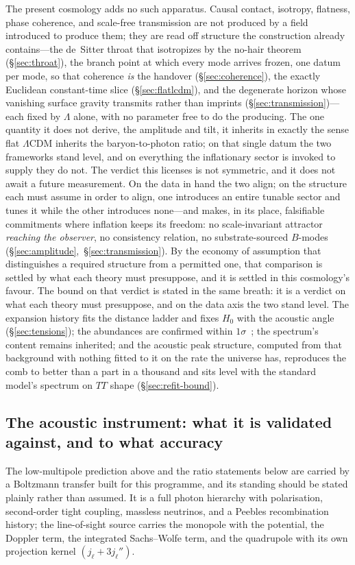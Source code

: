\documentclass[11pt,a4paper]{article}
\theoremstyle{plain}
\theoremstyle{definition}
\theoremstyle{remark}
\begin{document}
The present cosmology adds no such apparatus. Causal contact, isotropy, flatness, phase coherence, and scale-free transmission are not produced by a field introduced to produce them; they are read off structure the construction already contains---the de~Sitter throat that isotropizes by the no-hair theorem (\S\ref{sec:throat}), the branch point at which every mode arrives frozen, one datum per mode, so that coherence \emph{is} the handover (\S\ref{sec:coherence}), the exactly Euclidean constant-time slice (\S\ref{sec:flatlcdm}), and the degenerate horizon whose vanishing surface gravity transmits rather than imprints (\S\ref{sec:transmission})---each fixed by $\Lambda$ alone, with no parameter free to do the producing. The one quantity it does not derive, the amplitude and tilt, it inherits in exactly the sense flat $\Lambda$CDM inherits the baryon-to-photon ratio; on that single datum the two frameworks stand level, and on everything the inflationary sector is invoked to supply they do not. The verdict this licenses is not symmetric, and it does not await a future measurement. On the data in hand the two align; on the structure each must assume in order to align, one introduces an entire tunable sector and tunes it while the other introduces none---and makes, in its place, falsifiable commitments where inflation keeps its freedom: no scale-invariant attractor \emph{reaching the observer}, no consistency relation, no substrate-sourced $B$-modes (\S\ref{sec:amplitude},~\S\ref{sec:transmission}). By the economy of assumption that distinguishes a required structure from a permitted one, that comparison is settled by what each theory must presuppose, and it is settled in this cosmology's favour. The bound on that verdict is stated in the same breath: it is a verdict on what each theory must presuppose, and on the data axis the two stand level. The expansion history fits the distance ladder and fixes $H_0$ with the acoustic angle (\S\ref{sec:tensions}); the abundances are confirmed within $1\sigma$~\cite{JanzenCosmogenesis}; the spectrum's content remains inherited; and the acoustic peak structure, computed from that background with nothing fitted to it on the rate the universe has, reproduces the comb to better than a part in a thousand and sits level with the standard model's spectrum on $TT$ shape (\S\ref{sec:refit-bound}).

\subsection{The acoustic instrument: what it is validated against, and to what accuracy}\label{sec:instrument}
The low-multipole prediction above and the ratio statements below are carried by a Boltzmann transfer built for this programme, and its standing should be stated plainly rather than assumed. It is a full photon hierarchy with polarisation, second-order tight coupling, massless neutrinos, and a Peebles recombination history; the line-of-sight source carries the monopole with the potential, the Doppler term, the integrated Sachs--Wolfe term, and the quadrupole with its own projection kernel $(j_\ell+3j_\ell'')$.
\end{document}
